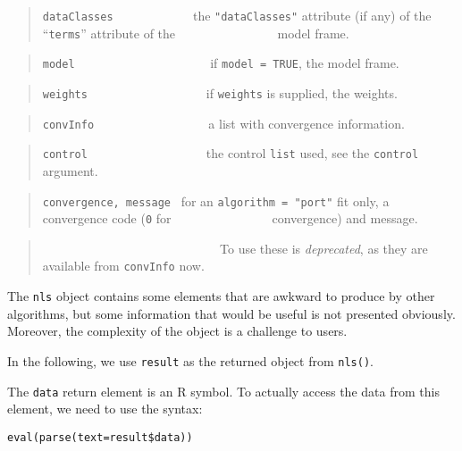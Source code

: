 \documentclass[
]{article}
\begin{document}
\begin{quote}
\texttt{dataClasses} ~ ~ ~ ~ ~ ~ ~ \(~\)the \texttt{"dataClasses"}
attribute (if any) of the ``\texttt{terms}'' attribute of the \newline
\(~~~~~~~~~~~~~~~~~~~~~~~~~~~~~~~~~~\) model frame.
\end{quote}

\begin{quote}
\texttt{model} ~ ~ ~ ~ ~ ~ ~ ~ ~ ~ ~ ~ ~if \texttt{model\ =\ TRUE}, the
model frame.
\end{quote}

\begin{quote}
\texttt{weights} ~ ~ ~ ~ ~ ~ ~ ~ ~ ~ ~ if \texttt{weights} is supplied,
the weights.
\end{quote}

\begin{quote}
\texttt{convInfo} ~ ~ ~ ~ ~ ~ ~ ~ ~ ~~ a list with convergence
information.
\end{quote}

\begin{quote}
\texttt{control} ~ ~ ~ ~ ~ ~ ~ ~ ~ ~ ~ the control \texttt{list} used,
see the \texttt{control} argument.
\end{quote}

\begin{quote}
\texttt{convergence,\ message} ~for an \texttt{algorithm\ =\ "port"} fit
only, a convergence code (\texttt{0} for \newline
\(~~~~~~~~~~~~~~~~~~~~~~~~~~~~~~~~~~~\)convergence) and message.
\end{quote}

\begin{quote}
~ ~ ~ ~ ~ ~ ~ ~ ~ ~ ~ ~ ~ ~ ~ ~ ~ To use these is \emph{deprecated}, as
they are available from \texttt{convInfo} now.
\end{quote}

The \texttt{nls} object contains some elements that are awkward to
produce by other algorithms, but some information that would be useful
is not presented obviously. Moreover, the complexity of the object is a
challenge to users.

In the following, we use \texttt{result} as the returned object from
\texttt{nls()}.

The \texttt{data} return element is an R symbol. To actually access the
data from this element, we need to use the syntax:

\begin{verbatim}
eval(parse(text=result$data))
\end{verbatim}
\end{document}

